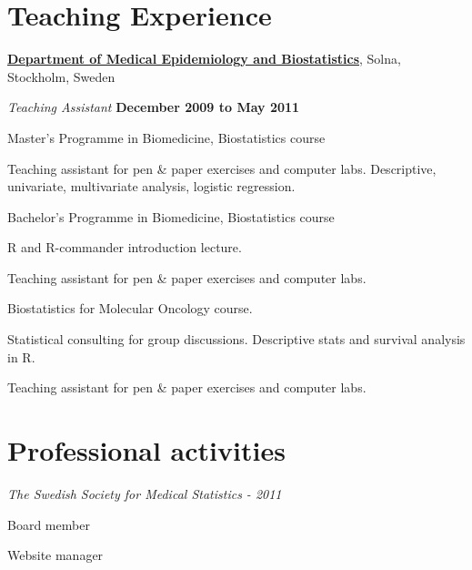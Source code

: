 %
%
\section{Teaching Experience}
\href{http://ki.se/ki/jsp/polopoly.jsp?d=9600}{\textbf{Department of Medical Epidemiology and Biostatistics}}, Solna, Stockholm, Sweden
\begin{outerlist}
\item[] \textit{Teaching Assistant}
    \hfill \textbf{December 2009 to May 2011}
    \begin{innerlist}

        \item Master's Programme in Biomedicine, Biostatistics course
        \begin{innerlist}
	    \item Teaching assistant for pen \& paper exercises and computer labs. Descriptive, univariate, multivariate analysis, logistic regression. 
        \end{innerlist}

        \halfblankline

        \item Bachelor's Programme in Biomedicine, Biostatistics course
        \begin{innerlist}
	    \item R and R-commander introduction lecture.
	    \item Teaching assistant for pen \& paper exercises and computer labs.
        \end{innerlist}

        \halfblankline

	\item Biostatistics for Molecular Oncology course.
        \begin{innerlist}
            \item Statistical consulting for group discussions. Descriptive stats and survival analysis in R.
	    \item Teaching assistant for pen \& paper exercises and computer labs.
        \end{innerlist}

    \end{innerlist}
\end{outerlist}

\section{Professional activities}
\textit{The Swedish Society for Medical Statistics - 2011}
\begin{innerlist}
    \item{Board member}
    \item{Website manager}
\end{innerlist}

